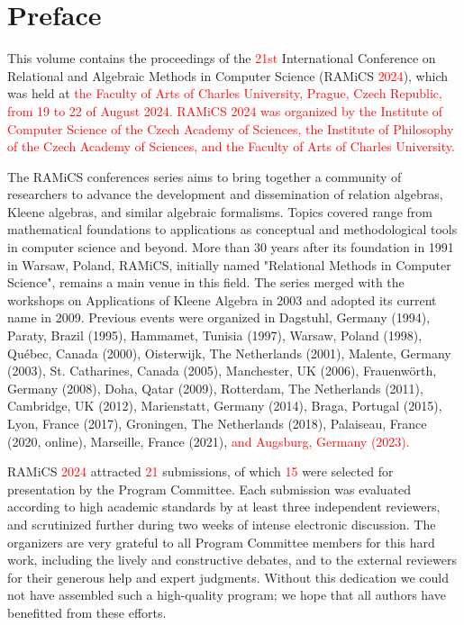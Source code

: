 \documentclass{llncs}
\newcommand{\red}[1]{\textcolor{red}{#1}}
\begin{document}
\section*{Preface}
This volume contains the proceedings of the \red{21st} International
Conference on Relational and Algebraic Methods in Computer Science
(RAMiCS \red{2024}), which was held at \red{the Faculty of Arts of Charles University, 
Prague, Czech Republic, from 19 to 22 of August 2024. RAMiCS 2024 was organized by the Institute of Computer Science of the Czech Academy of Sciences, the Institute of Philosophy of the Czech Academy of Sciences, and the Faculty of Arts of Charles University.}

The RAMiCS conferences series aims to bring together a community of
researchers to advance the development and dissemination of relation
algebras, Kleene algebras, and similar algebraic formalisms. Topics
covered range from mathematical foundations to applications as
conceptual and methodological tools in computer science and
beyond. More than 30 years after its foundation in 1991 in Warsaw,
Poland, RAMiCS, initially named "Relational Methods in Computer
Science", remains a main venue in this field. The series merged with
the workshops on Applications of Kleene Algebra in 2003 and adopted
its current name in 2009. Previous events were organized in Dagstuhl,
Germany (1994), Paraty, Brazil (1995), Hammamet, Tunisia (1997),
Warsaw, Poland (1998), Qu\'ebec, Canada (2000), Oisterwijk, The
Netherlands (2001), Malente, Germany (2003), St. Catharines, Canada
(2005), Manchester, UK (2006), Frauenw\"orth, Germany (2008), Doha,
Qatar (2009), Rotterdam, The Netherlands (2011), Cambridge, UK (2012),
Marienstatt, Germany (2014), Braga, Portugal (2015), Lyon, France
(2017), Groningen, The Netherlands (2018), Palaiseau, France (2020,
online), Marseille, France (2021), \red{and Augsburg, Germany (2023).}

RAMiCS \red{2024} attracted \red{21} submissions, of which \red{15} were
selected for presentation by the Program Committee. Each submission
was evaluated according to high academic standards by at least three
independent reviewers, and scrutinized further during two weeks of
intense electronic discussion. The organizers are very grateful to all
Program Committee members for this hard work, including the lively and
constructive debates, and to the external reviewers for their generous
help and expert judgments. Without this dedication we could not have
assembled such a high-quality program; we hope that all authors have
benefitted from these efforts.
\end{document}
